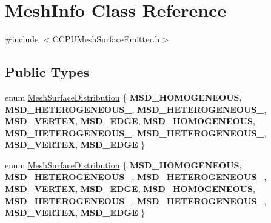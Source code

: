 \hypertarget{classMeshInfo}{}\section{Mesh\+Info Class Reference}
\label{classMeshInfo}


{\ttfamily \#include $<$C\+C\+P\+U\+Mesh\+Surface\+Emitter.\+h$>$}

\subsection*{Public Types}
\begin{DoxyCompactItemize}
\item 
enum \hyperlink{classMeshInfo_aadc99105abbc3bd033e33c6ba512a13b}{Mesh\+Surface\+Distribution} \{ \newline
{\bfseries M\+S\+D\+\_\+\+H\+O\+M\+O\+G\+E\+N\+E\+O\+US}, 
{\bfseries M\+S\+D\+\_\+\+H\+E\+T\+E\+R\+O\+G\+E\+N\+E\+O\+U\+S\+\_}, 
{\bfseries M\+S\+D\+\_\+\+H\+E\+T\+E\+R\+O\+G\+E\+N\+E\+O\+U\+S\+\_}, 
{\bfseries M\+S\+D\+\_\+\+V\+E\+R\+T\+EX}, 
\newline
{\bfseries M\+S\+D\+\_\+\+E\+D\+GE}, 
{\bfseries M\+S\+D\+\_\+\+H\+O\+M\+O\+G\+E\+N\+E\+O\+US}, 
{\bfseries M\+S\+D\+\_\+\+H\+E\+T\+E\+R\+O\+G\+E\+N\+E\+O\+U\+S\+\_}, 
{\bfseries M\+S\+D\+\_\+\+H\+E\+T\+E\+R\+O\+G\+E\+N\+E\+O\+U\+S\+\_}, 
\newline
{\bfseries M\+S\+D\+\_\+\+V\+E\+R\+T\+EX}, 
{\bfseries M\+S\+D\+\_\+\+E\+D\+GE}
 \}
\item 
enum \hyperlink{classMeshInfo_aadc99105abbc3bd033e33c6ba512a13b}{Mesh\+Surface\+Distribution} \{ \newline
{\bfseries M\+S\+D\+\_\+\+H\+O\+M\+O\+G\+E\+N\+E\+O\+US}, 
{\bfseries M\+S\+D\+\_\+\+H\+E\+T\+E\+R\+O\+G\+E\+N\+E\+O\+U\+S\+\_}, 
{\bfseries M\+S\+D\+\_\+\+H\+E\+T\+E\+R\+O\+G\+E\+N\+E\+O\+U\+S\+\_}, 
{\bfseries M\+S\+D\+\_\+\+V\+E\+R\+T\+EX}, 
\newline
{\bfseries M\+S\+D\+\_\+\+E\+D\+GE}, 
{\bfseries M\+S\+D\+\_\+\+H\+O\+M\+O\+G\+E\+N\+E\+O\+US}, 
{\bfseries M\+S\+D\+\_\+\+H\+E\+T\+E\+R\+O\+G\+E\+N\+E\+O\+U\+S\+\_}, 
{\bfseries M\+S\+D\+\_\+\+H\+E\+T\+E\+R\+O\+G\+E\+N\+E\+O\+U\+S\+\_}, 
\newline
{\bfseries M\+S\+D\+\_\+\+V\+E\+R\+T\+EX}, 
{\bfseries M\+S\+D\+\_\+\+E\+D\+GE}
 \}
\end{DoxyCompactItemize}

